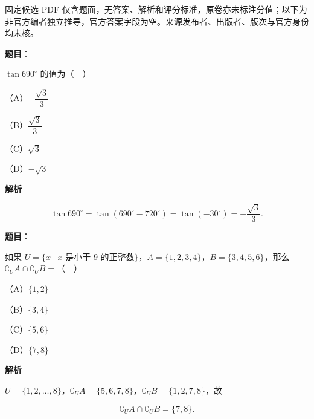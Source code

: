 

\begin{gktip}
固定候选 PDF 仅含题面，无答案、解析和评分标准，原卷亦未标注分值；以下为非官方编者独立推导，官方答案字段为空。来源发布者、出版者、版次与官方身份均未核。
\end{gktip}

\begin{answer}

\textbf{题目}：

$\tan690^\circ$ 的值为（　）

（A）$-\dfrac{\sqrt3}{3}$

（B）$\dfrac{\sqrt3}{3}$

（C）$\sqrt3$

（D）$-\sqrt3$

\textbf{解析}

\nopagebreak[4]
\[\tan690^\circ=\tan(690^\circ-720^\circ)=\tan(-30^\circ)=-\frac{\sqrt3}{3}.\]


\end{answer}
\begin{answer}

\textbf{题目}：

如果 $U=\{x\mid x$ 是小于 $9$ 的正整数$\}$，$A=\{1,2,3,4\}$，$B=\{3,4,5,6\}$，那么 $\complement_UA\cap\complement_UB=$（　）

（A）$\{1,2\}$

（B）$\{3,4\}$

（C）$\{5,6\}$

（D）$\{7,8\}$

\textbf{解析}

$U=\{1,2,\ldots,8\}$，$\complement_UA=\{5,6,7,8\}$，$\complement_UB=\{1,2,7,8\}$，故

\nopagebreak[4]
\[\complement_UA\cap\complement_UB=\{7,8\}.\]


\end{answer}
